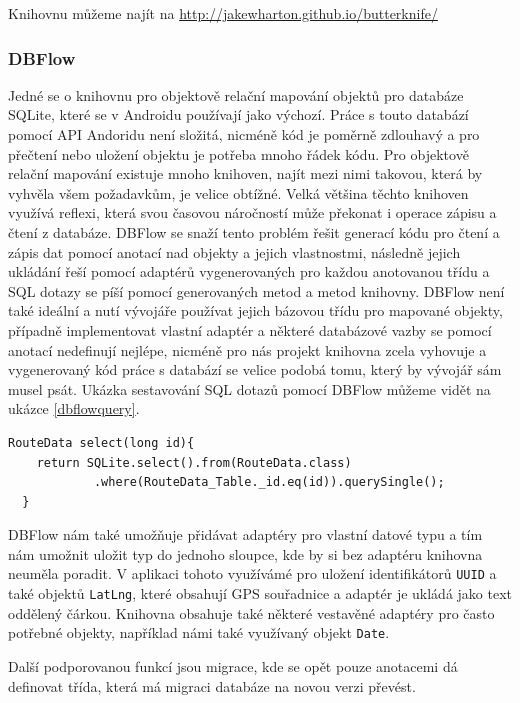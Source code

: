 \documentclass{article}
\begin{document}
Knihovnu můžeme najít na \url{http://jakewharton.github.io/butterknife/}

\subsubsection{DBFlow}\label{dbflow}
Jedné se o knihovnu pro objektově relační mapování objektů pro databáze SQLite, které se v
 Androidu používají jako výchozí. Práce s touto databází pomocí API Andoridu není
 složitá, nicméně kód je poměrně zdlouhavý a pro přečtení nebo uložení objektu je potřeba
 mnoho řádek kódu. Pro objektově relační mapování existuje mnoho knihoven, najít mezi nimi takovou,
 která by vyhvěla všem požadavkům, je velice obtížné. Velká většina těchto knihoven využívá reflexi,
 která svou časovou náročností může překonat i operace zápisu a čtení z databáze.
 DBFlow se snaží tento problém řešit generací kódu pro čtení a zápis dat pomocí anotací nad objekty
 a jejich vlastnostmi, následně jejich ukládání řeší pomocí adaptérů vygenerovaných pro každou anotovanou
 třídu a SQL dotazy se píší pomocí generovaných metod a metod knihovny. DBFlow není také ideální
  a nutí vývojáře používat jejich bázovou třídu pro mapované objekty, případně implementovat vlastní
  adaptér a některé databázové vazby se pomocí anotací nedefinují nejlépe, nicméně pro nás projekt
  knihovna zcela vyhovuje a vygenerovaný kód práce s databází se velice podobá tomu, který by vývojář
  sám musel psát. Ukázka sestavování SQL dotazů pomocí DBFlow můžeme vidět na ukázce \ref{dbflowquery}.

\begin{lstlisting}[label=dbflowquery,caption=Sestavování SQL dotazů s DBFlow]
  RouteData select(long id){
    return SQLite.select().from(RouteData.class)
            .where(RouteData_Table._id.eq(id)).querySingle();
  }
\end{lstlisting}

  DBFlow nám také umožňuje přidávat adaptéry pro vlastní datové typu a tím nám umožnit uložit
  typ do jednoho sloupce, kde by si bez adaptéru knihovna neuměla poradit. V aplikaci
  tohoto využívámé pro uložení identifikátorů \texttt{UUID} a také objektů \texttt{LatLng},
  které obsahují GPS souřadnice a adaptér je ukládá jako text oddělený čárkou.
  Knihovna obsahuje také některé vestavěné adaptéry pro často potřebné objekty, například námi
  také využívaný objekt \texttt{Date}.

  Další podporovanou funkcí jsou migrace, kde se opět pouze anotacemi dá definovat třída,
  která má migraci databáze na novou verzi převést.
\end{document}
